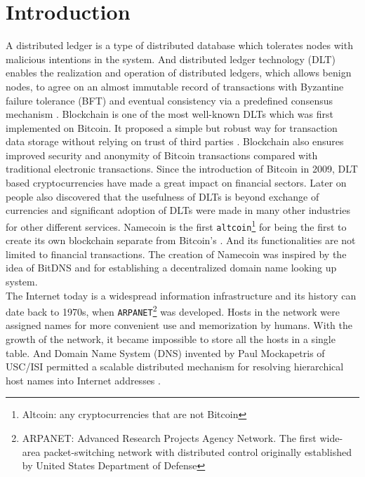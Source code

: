 \section{Introduction}
\label{sec:introduction}

A distributed ledger is a type of distributed database which tolerates nodes with malicious intentions in the system.
And distributed ledger technology (DLT) enables the realization and operation of distributed ledgers,
which allows benign nodes, to agree on an almost immutable record of transactions with Byzantine failure tolerance (BFT) and eventual consistency via a predefined consensus mechanism \cite{Sunyaev2020}.
Blockchain is one of the most well-known DLTs which was first implemented on Bitcoin. It proposed a simple but robust way for transaction data storage without relying on trust of third parties \cite{nakamoto2008peer}.
Blockchain also ensures improved security and anonymity of Bitcoin transactions compared with traditional electronic transactions.
Since the introduction of Bitcoin in 2009, DLT based cryptocurrencies have made a great impact on financial sectors. Later on people also discovered that the usefulness of DLTs is beyond exchange of currencies and
significant adoption of DLTs were made in many other industries for other different services. Namecoin is the first \texttt{altcoin}\footnote{Altcoin: any cryptocurrencies that are not Bitcoin} for being the first to create its own blockchain separate from Bitcoin's \cite{kalodner2015empirical}.
And its functionalities are not limited to financial transactions.
The creation of Namecoin was inspired by the idea of BitDNS \cite{merited2010bitdns} and for establishing a decentralized domain name looking up system. \\ 
The Internet today is a widespread information infrastructure and its history can date back to 1970s, when \texttt{ARPANET}\footnote{ARPANET: Advanced Research Projects Agency Network. The first wide-area packet-switching network with distributed control originally established by United States Department of Defense} was developed.
Hosts in the network were assigned names for more convenient use and memorization by humans. With the growth of the network, it became impossible to store all the hosts in a single table.
And Domain Name System (DNS) invented by Paul Mockapetris of USC/ISI permitted a scalable distributed mechanism for resolving hierarchical host names into Internet addresses \cite{leiner2009brief}.
